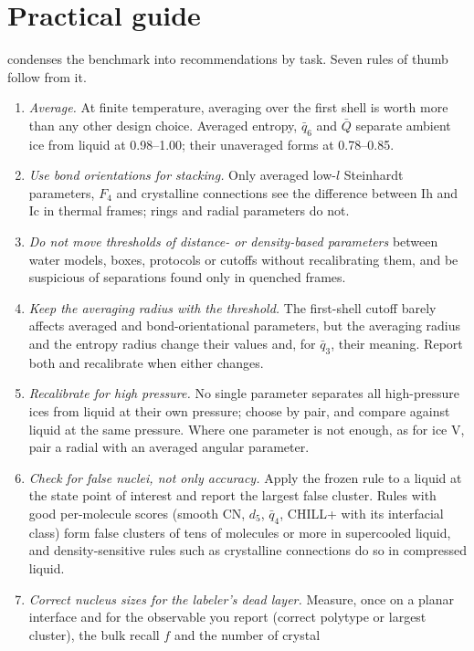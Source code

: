 \documentclass[11pt,a4paper]{article}
\begin{document}
\section{Practical guide}\label{sec:guide}
 condenses the benchmark into recommendations by task. Seven
rules of thumb follow from it.
\begin{enumerate}
\item \emph{Average.} At finite temperature, averaging over the first shell
is worth more than any other design choice. Averaged entropy, $\bar q_6$ and
$\bar Q$ separate ambient ice from liquid at 0.98--1.00; their unaveraged forms
at 0.78--0.85.
\item \emph{Use bond orientations for stacking.} Only averaged low-$l$
Steinhardt parameters, $F_4$ and crystalline connections see the difference
between Ih and Ic in thermal frames; rings and radial parameters do not.
\item \emph{Do not move thresholds of distance- or density-based parameters}
between water models, boxes, protocols or cutoffs without recalibrating them,
and be suspicious of separations found only in quenched frames.
\item \emph{Keep the averaging radius with the threshold.} The first-shell
cutoff barely affects averaged and bond-orientational parameters, but the
averaging radius and the entropy radius change their values and, for
$\bar q_3$, their meaning. Report both and recalibrate when either changes.
\item \emph{Recalibrate for high pressure.} No single parameter separates all
high-pressure ices from liquid at their own pressure; choose by pair, and
compare against liquid at the same pressure. Where one parameter is not
enough, as for ice V, pair a radial with an averaged angular parameter.
\item \emph{Check for false nuclei, not only accuracy.} Apply the frozen rule
to a liquid at the state point of interest and report the largest false
cluster. Rules with good per-molecule scores (smooth CN, $d_5$, $\bar q_4$,
CHILL+ with its interfacial class) form false clusters of tens of molecules or
more in supercooled liquid, and density-sensitive rules such as crystalline
connections do so in compressed liquid.
\item \emph{Correct nucleus sizes for the labeler's dead layer.} Measure,
once on a planar interface and for the observable you report (correct
polytype or largest cluster), the bulk recall $f$ and the number of crystal

\end{enumerate}
\end{document}
